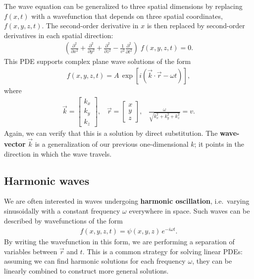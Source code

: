 \documentclass[10pt,a4paper]{article}
\begin{document}
The wave equation can be generalized to three spatial dimensions by
replacing $f(x,t)$ with a wavefunction that depends on three spatial
coordinates, $f(x,y,z,t)$.  The second-order derivative in $x$ is then
replaced by second-order derivatives in each spatial direction:
\begin{align}
  \left(\frac{\partial^2}{\partial x^2} + \frac{\partial^2}{\partial y^2} + \frac{\partial^2}{\partial z^2} - \frac{1}{v^2} \frac{\partial^2}{\partial t^2}\right) \; f(x,y,z,t) = 0.
  \label{eq:3dwave}
\end{align}
This PDE supports complex plane wave solutions of the form
\begin{align}
  f(x,y,z,t) = A \, \exp\left[i\left(\vec{k} \cdot \vec{r} - \omega t\right)\right],
\end{align}
where
\begin{align}
  \vec{k} = \begin{bmatrix}k_x\\k_y\\k_z\end{bmatrix}, \;\;\; \vec{r} = \begin{bmatrix}x\\y\\z\end{bmatrix}, \;\;\;\frac{\omega}{\sqrt{k_x^2 + k_y^2 + k_z^2}} = v.
\end{align}
Again, we can verify that this is a solution by direct substitution.
The \textbf{wave-vector} $\vec{k}$ is a generalization of our previous
one-dimensional $k$; it points in the direction in which the wave
travels.

\subsection{Harmonic waves}
\label{harmonic-waves}
We are often interested in waves undergoing \textbf{harmonic
  oscillation}, i.e.~varying sinusoidally with a constant frequency
$\omega$ everywhere in space.  Such waves can be described by
wavefunctions of the form
\begin{align}
  f(x,y,z,t) = \psi(x,y,z) \, e^{-i\omega t}.
\end{align}
By writing the wavefunction in this form, we are performing a
separation of variables between $\vec{r}$ and $t$. This is a common
strategy for solving linear PDEs: assuming we can find harmonic
solutions for each frequency $\omega$, they can be linearly combined
to construct more general solutions.
\end{document}
